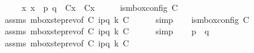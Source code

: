 \begin{isabellebody}
\ \ \ \ \ {\isachardoublequoteopen}{\isasymforall}x{\isachardot}{\kern0pt}\ x\ {\isasymnotin}\ {\isacharbraceleft}{\kern0pt}p{\isacharcomma}{\kern0pt}\ q{\isacharbraceright}{\kern0pt}\ {\isasymlongrightarrow}\ C{}{\isacharparenleft}{\kern0pt}x{\isacharparenright}{\kern0pt}\ {\isacharequal}{\kern0pt}\ C{}{\isacharparenleft}{\kern0pt}x{\isacharparenright}{\kern0pt}{\isachardoublequoteclose}\isanewline
%
\isadelimproof
%
\endisadelimproof
%
\isatagproof
{}\isamarkupfalse%
\ {\isacharminus}{\kern0pt}\isanewline
\ \ \isamarkupfalse%
\ {\isachardoublequoteopen}is{\isacharunderscore}{\kern0pt}mbox{\isacharunderscore}{\kern0pt}config\ C{}{\isachardoublequoteclose}\isanewline
\ \ \ \ \isamarkupfalse%
\ assms\ mbox{\isacharunderscore}{\kern0pt}step{\isacharunderscore}{\kern0pt}rev{\isacharparenleft}{\kern0pt}{}{\isacharparenright}{\kern0pt}{\isacharbrackleft}{\kern0pt}of\ C{}\ {\isachardoublequoteopen}{\isacharbang}{\kern0pt}{\isasymlangle}{\isacharparenleft}{\kern0pt}i\isactrlbsup p{\isasymrightarrow}q\isactrlesup {\isacharparenright}{\kern0pt}{\isasymrangle}{\isachardoublequoteclose}\ k\ C{}{\isacharbrackright}{\kern0pt}\isanewline
\ \ \ \ \isamarkupfalse%
\ simp\isanewline
\ \ \isamarkupfalse%
\ {\isachardoublequoteopen}is{\isacharunderscore}{\kern0pt}mbox{\isacharunderscore}{\kern0pt}config\ C{}{\isachardoublequoteclose}\isanewline
\ \ \ \ \isamarkupfalse%
\ assms\ mbox{\isacharunderscore}{\kern0pt}step{\isacharunderscore}{\kern0pt}rev{\isacharparenleft}{\kern0pt}{}{\isacharparenright}{\kern0pt}{\isacharbrackleft}{\kern0pt}of\ C{}\ {\isachardoublequoteopen}{\isacharbang}{\kern0pt}{\isasymlangle}{\isacharparenleft}{\kern0pt}i\isactrlbsup p{\isasymrightarrow}q\isactrlesup {\isacharparenright}{\kern0pt}{\isasymrangle}{\isachardoublequoteclose}\ k\ C{}{\isacharbrackright}{\kern0pt}\isanewline
\ \ \ \ \isamarkupfalse%
\ simp\isanewline
\ \ \isamarkupfalse%
\ {\isachardoublequoteopen}p\ {\isasymnoteq}\ q{\isachardoublequoteclose}\isanewline
\ \ \ \ \isamarkupfalse%
\ assms\ mbox{\isacharunderscore}{\kern0pt}step{\isacharunderscore}{\kern0pt}rev{\isacharparenleft}{\kern0pt}{}{\isacharparenright}{\kern0pt}{\isacharbrackleft}{\kern0pt}of\ C{}\ {\isachardoublequoteopen}{\isacharbang}{\kern0pt}{\isasymlangle}{\isacharparenleft}{\kern0pt}i\isactrlbsup p{\isasymrightarrow}q\isactrlesup {\isacharparenright}{\kern0pt}{\isasymrangle}{\isachardoublequoteclose}\ k\ C{}{\isacharbrackright}{\kern0pt}\isanewline

\end{isabellebody}
